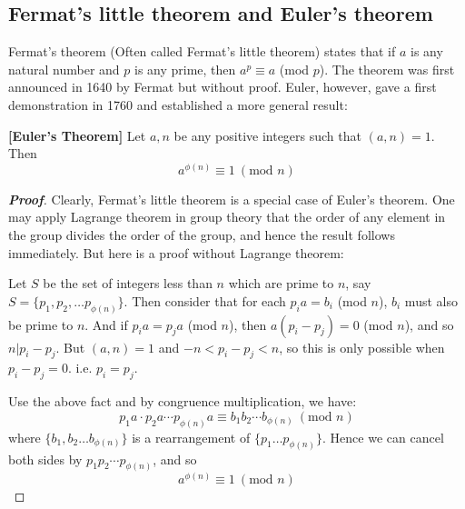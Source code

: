 \subsection{Fermat's little theorem and Euler's theorem}
Fermat's theorem (Often called Fermat's little theorem) states that if $a$ is any natural number and $p$ is any prime, then $a^p \equiv a$ (mod $p$). The theorem was first announced in 1640 by Fermat but without proof. Euler, however, gave a first demonstration in 1760 and established a more general result:
\begin{theorem}{\bf [Euler's Theorem]}\label{E;Euler} Let $a,n$ be any positive integers such that $(a,n)=1$. Then
\begin{equation*} a^{\phi(n)} \equiv 1 ~(\text{mod }n) \end{equation*}
\end{theorem}
\begin{proof}[\bf Proof] Clearly, Fermat's little theorem is a special case of Euler's theorem. One may apply Lagrange theorem in group theory that the order of any element in the group divides the order of the group, and hence the result follows immediately. But here is a proof without Lagrange theorem:

Let $S$ be the set of integers less than $n$ which are prime to $n$, say $S=\{p_1,p_2,\ldots p_{\phi(n)}\}$. Then consider that for each $p_i a = b_i$ (mod $n$), $b_i$ must also be prime to $n$. And if $p_i a = p_j a$ (mod $n$), then $a(p_i - p_j) = 0$ (mod $n$), and so $n|p_i-p_j$. But $(a,n)=1$ and $-n < p_i -p_j <n$, so this is only possible when $p_i - p_j=0$. i.e. $p_i=p_j$.

Use the above fact and by congruence multiplication, we have:
\begin{equation*} p_1 a \cdot p_2 a \cdots p_{\phi(n)} a \equiv b_1 b_2 \cdots b_{\phi(n)} ~(\text{mod } n)
\end{equation*}
where $\{b_1,b_2 \ldots b_{\phi(n)}\}$ is a rearrangement of $\{p_1 \ldots p_{\phi(n)}\}$. Hence we can cancel both sides by $p_1 p_2 \cdots p_{\phi(n)}$, and so
\begin{equation*} a^{\phi(n)} \equiv 1~(\text{mod } n) \end{equation*}
\end{proof}
